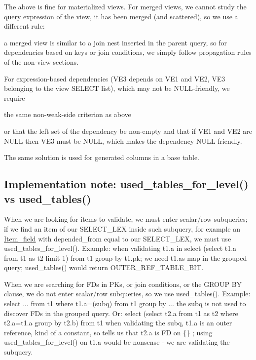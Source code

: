 The above is fine for materialized views. For merged views, we cannot study the query expression of the view, it has been merged (and scattered), so we use a different rule\+:
\begin{DoxyItemize}
\item a merged view is similar to a join nest inserted in the parent query, so for dependencies based on keys or join conditions, we simply follow propagation rules of the non-\/view sections.
\item For expression-\/based dependencies (V\+E3 depends on V\+E1 and V\+E2, V\+E3 belonging to the view S\+E\+L\+E\+CT list), which may not be N\+U\+LL-\/friendly, we require
\item the same non-\/weak-\/side criterion as above
\item or that the left set of the dependency be non-\/empty and that if V\+E1 and V\+E2 are N\+U\+LL then V\+E3 must be N\+U\+LL, which makes the dependency N\+U\+LL-\/friendly.
\item The same solution is used for generated columns in a base table.
\end{DoxyItemize}\hypertarget{group__AGGREGATE__CHECKS_USED_TABLES}{}\subsection{Implementation note\+: used\+\_\+tables\+\_\+for\+\_\+level() vs used\+\_\+tables()}\label{group__AGGREGATE__CHECKS_USED_TABLES}

\begin{DoxyItemize}
\item When we are looking for items to validate, we must enter scalar/row subqueries; if we find an item of our S\+E\+L\+E\+C\+T\+\_\+\+L\+EX inside such subquery, for example an \mbox{\hyperlink{classItem__field}{Item\+\_\+field}} with depended\+\_\+from equal to our S\+E\+L\+E\+C\+T\+\_\+\+L\+EX, we must use used\+\_\+tables\+\_\+for\+\_\+level(). Example\+: when validating t1.\+a in select (select t1.\+a from t1 as t2 limit 1) from t1 group by t1.\+pk; we need t1.\+a\textquotesingle{}s map in the grouped query; used\+\_\+tables() would return O\+U\+T\+E\+R\+\_\+\+R\+E\+F\+\_\+\+T\+A\+B\+L\+E\+\_\+\+B\+IT.
\item When we are searching for F\+Ds in P\+Ks, or join conditions, or the G\+R\+O\+UP BY clause, we do not enter scalar/row subqueries, so we use used\+\_\+tables(). Example\+: select ... from t1 where t1.\+a=(subq) from t1 group by ... the subq is not used to discover F\+Ds in the grouped query. Or\+: select (select t2.\+a from t1 as t2 where t2.\+a=t1.\+a group by t2.\+b) from t1 when validating the subq, t1.\+a is an outer reference, kind of a constant, so tells us that t2.\+a is FD on \{\} ; using used\+\_\+tables\+\_\+for\+\_\+level() on t1.\+a would be nonsense -\/ we are validating the subquery. 
\end{DoxyItemize}

